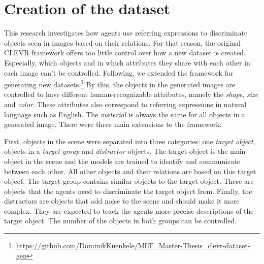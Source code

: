 \section{Creation of the dataset}
\label{sec:creation-dataset}
This research investigates how agents use referring expressions to discriminate objects seen in images based on their relations.
For that reason, the original CLEVR framework offers too little control over how a new dataset is created.
Especially, which objects and in which attributes they share with each other in each image can't be controlled.
Following, we extended the framework for generating new datasets.\footnote{\href{https://github.com/DominikKuenkele/MLT\_Master-Thesis\_clevr-dataset-gen}{https://github.com/DominikKuenkele/MLT\_Master-Thesis\_clevr-dataset-gen}}
By this, the objects in the generated images are controlled to have different human-recognizable attributes, namely the \emph{shape}, \emph{size} and \emph{color}.
These attributes also correspond to referring expressions in natural language such as English.
The \emph{material} is always the same for all objects in a generated image.
There were three main extensions to the framework:

First, objects in the scene were separated into three categories: one \emph{target object}, objects in a \emph{target group} and \emph{distractor} objects.
The target object is the main object in the scene and the models are trained to identify and communicate between each other.
All other objects and their relations are based on this target object.
The target group contains similar objects to the target object.
These are objects that the agents need to discriminate the target object from.
Finally, the distractors are objects that add noise to the scene and should make it more complex. They are expected to teach the agents more precise descriptions of the target object.
The number of the objects in both groups can be controlled.

